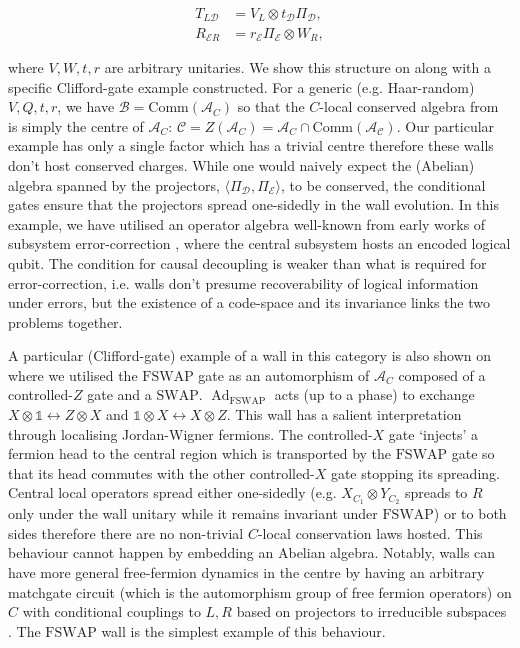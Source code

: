 \documentclass[11pt, twocolumn, floatfix, superscriptaddress, aps, prb, raggedbottom]{revtex4-2}
\newcommand{\comm}{\mathrm{Comm}}
\newcommand{\FSWAP}{\mathrm{FSWAP}}
\newcommand{\Id}{\mathds{1}}
\DeclareMathOperator{\Ad}{Ad}
\begin{document}
\begin{align}
    T_{L\mathcal{D}} &= V_L \otimes t_{\mathcal{D}}\Pi_{\mathcal{D}}, \\
    R_{{\mathcal{E}R}} &= r_{\mathcal{E}} \Pi_{\mathcal{E}} \otimes W_R, 
\end{align}

\noindent where $V, W, t, r$ are arbitrary unitaries. We show this structure on  along with a specific Clifford-gate example constructed. For a generic (e.g. Haar-random) $V, Q, t, r$, we have $\mathcal{B} = \comm(\mathcal{A}_C)$ so that the $C$-local conserved algebra from  is simply the centre of $\mathcal{A}_C$: $\mathcal{C} = Z(\mathcal{A}_C) = \mathcal{A}_C \cap \comm(\mathcal{A_C})$. Our particular example has only a single factor which has a trivial centre therefore these walls don't host conserved charges. While one would naively expect the (Abelian) algebra spanned by the projectors, $\langle \Pi_{\mathcal{D}}, \Pi_{\mathcal{E}} \rangle$, to be conserved, the conditional gates ensure that the projectors spread one-sidedly in the wall evolution. In this example, we have utilised an operator algebra well-known from early works of subsystem error-correction \cite{Poulin2005_subsystem_QEC,kribs2006operatorquantumerrorcorrection, Dauphinais2024stabilizerformalism}, where the central subsystem hosts an encoded logical qubit. The condition for causal decoupling is weaker than what is required for error-correction, i.e. walls don't presume recoverability of logical information under errors, but the existence of a code-space and its invariance links the two problems together. 

A particular (Clifford-gate) example of a wall in this category is also shown on  where we utilised  the $\FSWAP$ gate as an automorphism of $\mathcal{A}_C$ composed of a controlled-$Z$ gate and a $\mathrm{SWAP}$. $\Ad_{\FSWAP}$ acts (up to a phase) to exchange $X \otimes \Id \leftrightarrow Z \otimes X$ and $\Id \otimes X \leftrightarrow X \otimes Z$. This wall has a salient interpretation through localising Jordan-Wigner fermions. The controlled-$X$ gate \enquote*{injects} a fermion head to the central region which is transported by the $\FSWAP$ gate so that its head commutes with the other controlled-$X$ gate stopping its spreading. Central local operators spread either one-sidedly (e.g. $X_{C_1} \otimes Y_{C_2}$ spreads to $R$ only under the wall unitary while it remains invariant under $\FSWAP$) or to both sides therefore there are no non-trivial $C$-local conservation laws hosted. This behaviour cannot happen by embedding an Abelian algebra. Notably, walls can have more general free-fermion dynamics in the centre by having an arbitrary matchgate circuit (which is the automorphism group of free fermion operators) on $C$ with conditional couplings to $L, R$ based on projectors to irreducible subspaces \cite{Valiant2002SIAMMatchgates, TerhalDiVincenzo2002NoninteractingFermions}. The $\mathrm{FSWAP}$ wall is the simplest example of this behaviour.
\end{document}
